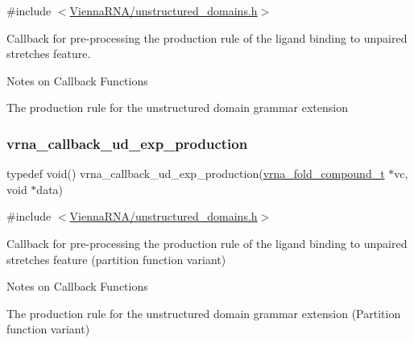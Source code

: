 {\ttfamily \#include $<$\mbox{\hyperlink{unstructured__domains_8h}{Vienna\+R\+N\+A/unstructured\+\_\+domains.\+h}}$>$}



Callback for pre-\/processing the production rule of the ligand binding to unpaired stretches feature. 

\begin{DoxyRefDesc}{Notes on Callback Functions}
\item[\mbox{\hyperlink{callbacks__callbacks000012}{Notes on Callback Functions}}]The production rule for the unstructured domain grammar extension \end{DoxyRefDesc}
\mbox{\label{group__domains__up_ga33d78327dcd04c1ca5ab2887edc18c7b}} 
\subsubsection{\texorpdfstring{vrna\+\_\+callback\+\_\+ud\+\_\+exp\+\_\+production}{vrna\_callback\_ud\_exp\_production}}
{\footnotesize\ttfamily typedef void() vrna\+\_\+callback\+\_\+ud\+\_\+exp\+\_\+production(\mbox{\hyperlink{group__fold__compound_ga1b0cef17fd40466cef5968eaeeff6166}{vrna\+\_\+fold\+\_\+compound\+\_\+t}} $\ast$vc, void $\ast$data)}



{\ttfamily \#include $<$\mbox{\hyperlink{unstructured__domains_8h}{Vienna\+R\+N\+A/unstructured\+\_\+domains.\+h}}$>$}



Callback for pre-\/processing the production rule of the ligand binding to unpaired stretches feature (partition function variant) 

\begin{DoxyRefDesc}{Notes on Callback Functions}
\item[\mbox{\hyperlink{callbacks__callbacks000013}{Notes on Callback Functions}}]The production rule for the unstructured domain grammar extension (Partition function variant) \end{DoxyRefDesc}
\mbox{\label{group__domains__up_gab10498abc84fcaf336aca8f8d7d42eb2}} 
